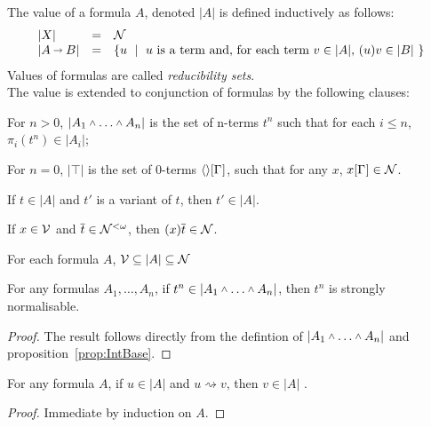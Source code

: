 \documentclass{llncs} %
\begin{document}
\begin{definition}
The value of a formula $A$, denoted $|A|$ is defined inductively as follows:
\[
\begin{array}{lll}
|X| & = & \mathcal{N}
\\
|A\vlim B| & = & \mbox{\{$u$ \;|\;  $u$ is a term and, for each term $v\in |A|$, $(u)v \in |B|$ \}}
\end{array}
\]
Values of formulas are called {\em reducibility sets}. \\
The value is extended to conjunction of formulas by the following clauses:

 For $n>0$, $|A_1\vlan\dots\vlan A_n|$ is the set of n-terms $t^n$ such that for each $i \leq n$, $\pi_i(t^n) \in |A_i|$;

 For $n=0$, $|\top|$ is the set of $0$-terms $\tup*{}\G$, such that for any $x$, $x\G\in\SN$.

\end{definition}


\begin{remark}
If $t\in|A|$ and $t'$ is a variant of $t$, then $t'\in|A|$.
\end{remark}

\begin{lemma}\label{lem:HeadVar}
If $x\in \mathcal{V}$ and $\overline{t} \in \mathcal{N}^{<\omega}$, then
$(x)\overline{t} \in \mathcal{N}$.
\end{lemma}

\begin{proposition}\label{prop:IntBase}
For each formula $A$, $\mathcal{V} \subseteq |A| \subseteq  \mathcal{N}$
\end{proposition}

\begin{proposition}
 For any formulas $A_1,\dots,A_n$, if $t^n \in |A_1\vlan\dots\vlan A_n|$, then $t^n$ is strongly normalisable.
\end{proposition}

\begin{proof}
The result follows directly from the defintion of  $|A_1\vlan\dots\vlan A_n|$ and proposition~\ref{prop:IntBase}.
\end{proof}

\begin{lemma}\label{lem:RedStab}
For any formula $A$,  if $u\in |A|$ and $u \rightsquigarrow v$, then $v \in |A|$ .
\end{lemma}

\begin{proof}
 Immediate by induction on $A$.
\end{proof}
\end{document}

